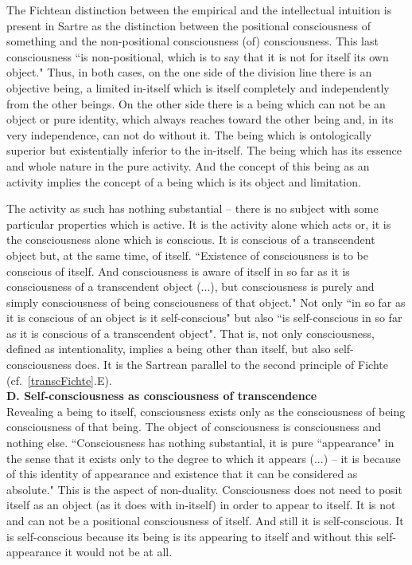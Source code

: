 The Fichtean distinction between the empirical and the intellectual intuition is present in Sartre as the distinction 
between the positional consciousness of something and the non-positional consciousness (of) consciousness. This 
last consciousness ``is non-positional, which is to say that it is not for itself its own object." \cite{ToE} Thus, in both 
cases, on the one side of the division line there is an objective being, a limited in-itself which is itself completely 
and independently from the other beings. On the other side there is a being which can not be an object or pure 
identity, which always reaches toward the other being and, in its very independence, can not do without it. The 
being which is ontologically superior but existentially inferior to the in-itself. The being which has its essence and 
whole nature in the pure activity. And the concept of this being as an activity implies the concept of a being 
which is its object and limitation.

The activity as such has nothing substantial -- there is no subject with some particular properties which is active. 
It is the activity alone which acts or, it is the consciousness alone which is conscious. It is conscious of a 
transcendent object but, at the same time, of itself. ``Existence of consciousness is to be conscious of itself. And 
consciousness is aware of itself in so far as it is consciousness of a transcendent object (...), but consciousness is 
purely and simply consciousness of being consciousness of that object." \cite{ToE} Not only ``in so far as it is conscious of 
an object is it self-conscious" but also ``is self-conscious in so far as it is conscious of a transcendent object". That 
is, not only consciousness, defined as intentionality, implies a being other than itself, but also self-consciousness does. It is the Sartrean parallel to the second principle of Fichte (cf.~\ref{transcFichte}.E). \\[1ex]
{\bf D. Self-consciousness as consciousness of transcendence} \\
Revealing a being to itself, consciousness exists only as the consciousness of being consciousness of that 
being. The object of consciousness is consciousness and nothing else. ``Consciousness has nothing substantial, it 
is pure ``appearance" in the sense that it exists only to the degree to which it appears (...) -- it is because of this 
identity of appearance and existence that it can be considered as absolute." \cite{BN}   This is the aspect of non-duality. 
Consciousness does not need to posit itself as an object (as it does with in-itself) in order to appear to itself. It is 
not and can not be a positional consciousness of itself. And still it is self-conscious. It is self-conscious because 
its being is its appearing to itself and without this self-appearance it would not be at all.


